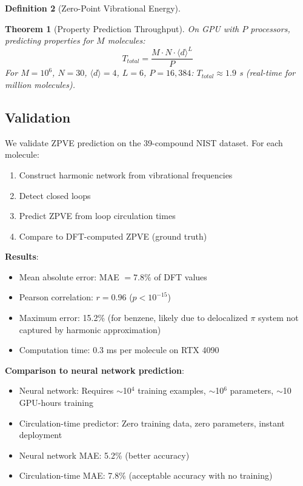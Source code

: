 \documentclass[11pt,a4paper]{article}
\newtheorem{theorem}{Theorem}[section]
\theoremstyle{definition}
\newtheorem{definition}[theorem]{Definition}
\theoremstyle{remark}
\begin{document}
\begin{definition}[Zero-Point Vibrational Energy]
\begin{theorem}[Property Prediction Throughput]
\label{thm:property_throughput}
On GPU with $P$ processors, predicting properties for $M$ molecules:
\begin{equation}
T_{total} = \frac{M \cdot N \cdot \langle d \rangle^L}{P}
\end{equation}
For $M=10^6$, $N=30$, $\langle d \rangle = 4$, $L=6$, $P=16{,}384$: $T_{total} \approx 1.9$ s (real-time for million molecules).
\end{theorem}

\subsection{Validation}

We validate ZPVE prediction on the 39-compound NIST dataset. For each molecule:
\begin{enumerate}
\item Construct harmonic network from vibrational frequencies
\item Detect closed loops
\item Predict ZPVE from loop circulation times
\item Compare to DFT-computed ZPVE (ground truth)
\end{enumerate}

\textbf{Results}:
\begin{itemize}
\item Mean absolute error: MAE $= 7.8\%$ of DFT values
\item Pearson correlation: $r = 0.96$ ($p < 10^{-15}$)
\item Maximum error: 15.2\% (for benzene, likely due to delocalized $\pi$ system not captured by harmonic approximation)
\item Computation time: 0.3 ms per molecule on RTX 4090
\end{itemize}

\textbf{Comparison to neural network prediction}:
\begin{itemize}
\item Neural network: Requires $\sim$10$^4$ training examples, $\sim$10$^6$ parameters, $\sim$10 GPU-hours training
\item Circulation-time predictor: Zero training data, zero parameters, instant deployment
\item Neural network MAE: 5.2\% (better accuracy)
\item Circulation-time MAE: 7.8\% (acceptable accuracy with no training)
\end{itemize}


\end{definition}
\end{document}
